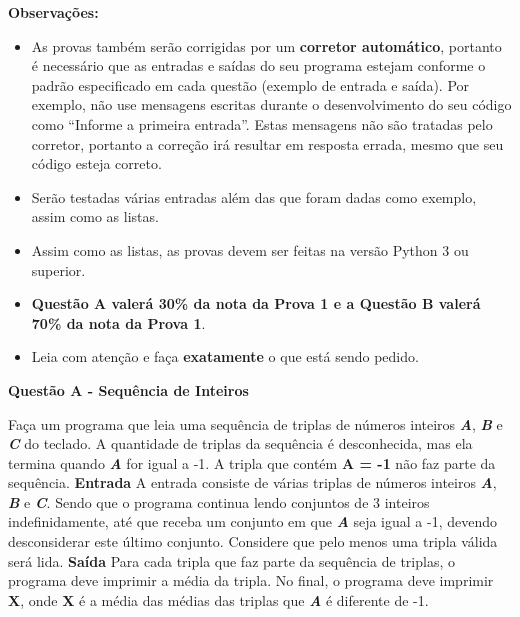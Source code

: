 \documentclass[a4paper, 12pt]{article}
\begin{document}
\textbf{{\large Observações:}}
\begin{itemize}
	\item As provas também serão corrigidas por um \textbf{corretor automático}, portanto é necessário que as entradas e saídas do seu programa estejam conforme o padrão especificado em cada questão (exemplo de entrada e saída). Por exemplo, não use mensagens escritas durante o desenvolvimento do seu código como “Informe a primeira entrada”. Estas mensagens não são tratadas pelo corretor, portanto a correção irá resultar em resposta errada, mesmo que seu código esteja correto.
	\item Serão testadas várias entradas além das que foram dadas como exemplo, assim como as listas.
	\item Assim como as listas, as provas devem ser feitas na versão Python 3 ou superior.
	\item \textbf{Questão A valerá 30\% da nota da Prova 1 e a Questão B valerá 70\% da nota da Prova 1}.
	\item Leia com atenção e faça \textbf{exatamente} o que está sendo pedido.
\end{itemize}
\newpage %
\begin{center}
\textbf{{\Large Questão A - Sequência de Inteiros}}
\end{center}
\vspace{5pt}
Faça um programa que leia uma sequência de triplas de números inteiros \textbf{\textit{A}}, \textbf{\textit{B}} e \textbf{\textit{C}} do teclado. A quantidade de triplas da sequência é desconhecida, mas ela termina quando \textbf{\textit{A}} for igual a -1. A tripla que contém \textbf{A = -1} não faz parte da sequência.
\newline \newline
\textbf{{\large Entrada}} \newline
A entrada consiste de várias triplas de números inteiros  \textbf{\textit{A}}, \textbf{\textit{B}} e \textbf{\textit{C}}. Sendo que o programa continua lendo conjuntos de 3 inteiros indefinidamente, até que receba um conjunto em que \textbf{\textit{A}} seja igual a -1, devendo desconsiderar este último conjunto. Considere que pelo menos uma tripla válida será lida.
\newline \newline
\textbf{{\large Saída}} \newline
Para cada tripla que faz parte da sequência de triplas, o programa deve imprimir a média da tripla. No final, o programa deve imprimir \textbf{X}, onde \textbf{X} é a média das médias das triplas que \textbf{\textit{A}} é diferente de -1.
\end{document}

